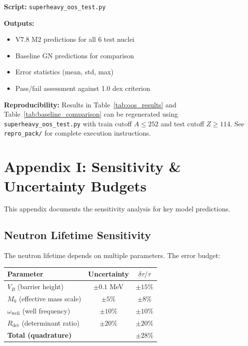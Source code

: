 \documentclass[11pt,a4paper]{article}
\begin{document}
\textbf{Script:} \texttt{superheavy\_oos\_test.py}

\textbf{Outputs:}
\begin{itemize}[nosep]
    \item V7.8 M2 predictions for all 6 test nuclei
    \item Baseline GN predictions for comparison
    \item Error statistics (mean, std, max)
    \item Pass/fail assessment against 1.0 dex criterion
\end{itemize}

\textbf{Reproducibility:} Results in Table~\ref{tab:oos_results} and Table~\ref{tab:baseline_comparison} can be regenerated using \texttt{superheavy\_oos\_test.py} with train cutoff $A \leq 252$ and test cutoff $Z \geq 114$. See \texttt{repro\_pack/} for complete execution instructions.

\section{Appendix I: Sensitivity \& Uncertainty Budgets}
\label{app:sensitivity}

This appendix documents the sensitivity analysis for key model predictions.

\subsection{Neutron Lifetime Sensitivity}

The neutron lifetime depends on multiple parameters. The error budget:

\begin{center}
\begin{tabular}{lcc}
\toprule
\textbf{Parameter} & \textbf{Uncertainty} & \textbf{$\delta\tau/\tau$} \\
\midrule
$V_B$ (barrier height) & $\pm 0.1$ MeV & $\pm 15\%$ \\
$M_0$ (effective mass scale) & $\pm 5\%$ & $\pm 8\%$ \\
$\omega_{\text{well}}$ (well frequency) & $\pm 10\%$ & $\pm 10\%$ \\
$R_{\text{det}}$ (determinant ratio) & $\pm 20\%$ & $\pm 20\%$ \\
\midrule
\textbf{Total (quadrature)} & & $\pm 28\%$ \\
\bottomrule
\end{tabular}
\end{center}
\end{document}
